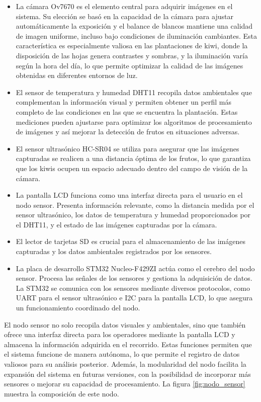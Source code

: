 \begin{itemize}
\item La cámara Ov7670 es el elemento central para adquirir imágenes en el sistema. Su elección se basó en la capacidad de la cámara para ajustar automáticamente la exposición y el balance de blancos mantiene una calidad de imagen uniforme, incluso bajo condiciones de iluminación cambiantes. Esta característica es especialmente valiosa en las plantaciones de kiwi, donde la disposición de las hojas genera contrastes y sombras, y la iluminación varía según la hora del día, lo que permite optimizar la calidad de las imágenes obtenidas en diferentes entornos de luz.

\item El sensor de temperatura y humedad DHT11 recopila datos ambientales que complementan la información visual y  permiten obtener un perfil más completo de las condiciones en las que se encuentra la plantación. Estas mediciones pueden ajustarse para optimizar los algoritmos de procesamiento de imágenes y así mejorar la detección de frutos en situaciones adversas.
\item El sensor ultrasónico HC-SR04 se utiliza para asegurar que las imágenes capturadas se realicen a una distancia óptima de los frutos, lo que garantiza que los kiwis ocupen un espacio adecuado dentro del campo de visión de la cámara.
\item La pantalla LCD funciona como una interfaz directa para el usuario en el nodo sensor. Presenta información relevante, como la distancia medida por el sensor ultrasónico, los datos de temperatura y humedad proporcionados por el DHT11, y el estado de las imágenes capturadas por la cámara.
\item El lector de tarjetas SD es crucial para el almacenamiento de las imágenes capturadas y los datos ambientales registrados por los sensores.
\item La placa de desarrollo STM32 Nucleo-F429ZI actúa como el cerebro del nodo sensor. Procesa las señales de los sensores y gestiona la adquisición de datos. La STM32 se comunica con los sensores mediante diversos protocolos, como UART para el sensor ultrasónico e I2C para la pantalla LCD, lo que asegura un funcionamiento coordinado del nodo.
\end{itemize}

El nodo sensor no solo recopila datos visuales y ambientales, sino que también ofrece una interfaz directa para los operadores mediante la pantalla LCD y almacena la información adquirida en el recorrido. Estas funciones permiten que el sistema funcione de manera autónoma, lo que permite el registro de datos valiosos para su análisis posterior. Además, la modularidad del nodo facilita la expansión del sistema en futuras versiones, con la posibilidad de incorporar más sensores o mejorar su capacidad de procesamiento. La figura \ref{fig:nodo_sensor} muestra la composición de este nodo.

